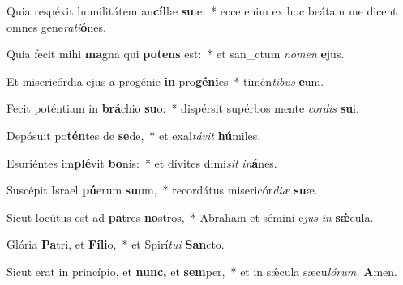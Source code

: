 \item Quia respéxit humilitátem an\textbf{cíl}læ \textbf{su}æ:~* ecce enim ex hoc beátam me dicent omnes gene\textit{rati}\textbf{ó}nes.
\item Quia fecit mihi \textbf{ma}gna qui \textbf{pot}\textbf{ens} est:~* et san\_ctum \textit{nomen} \textbf{e}jus.
\item Et misericórdia ejus a progénie \textbf{in} pro\textbf{gé}\textbf{ni}es~* timén\textit{tibus} \textbf{e}um.
\item Fecit poténtiam in \textbf{brá}chio \textbf{su}o:~* dispérsit supérbos mente \textit{cordis} \textbf{su}i.
\item Depósuit po\textbf{tén}tes de \textbf{se}de,~* et exal\textit{távit} \textbf{hú}miles.
\item Esuriéntes im\textbf{plé}vit \textbf{bo}nis:~* et dívites dimí\hspace{0.04em}\textit{sit} \textit{in}\textbf{á}nes.
\item Suscépit Israel \textbf{pú}erum \textbf{su}um,~* recordátus misericór\textit{diæ} \textbf{su}æ.
\item Sicut locútus est ad \textbf{pa}tres \textbf{no}stros,~* Abraham et sémini e\tinyhspace\textit{jus} \textit{in} \textbf{sǽ}cula.
\item Glória \textbf{Pa}tri, et \textbf{Fí}\textbf{li}o,~* et Spirí\tinyhspace\textit{tui} \textbf{San}cto.
\item Sicut erat in princípio, et \textbf{nunc,} et \textbf{sem}per,~* et in sǽcula sæcu\tinyhspace\textit{lórum.} \textbf{A}men.


